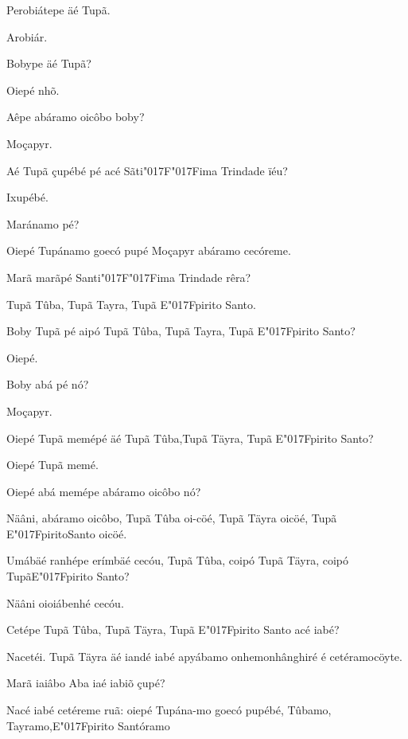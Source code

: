 \documentclass[openany,titlepage,12pt]{book}
\newcommand{\lgS}{\char"017F}
\newcommand{\lgSS}{\char"017F\char"017F}
\begin{document}
\begin{alternate}
    \item Perobiátepe äé Tupã.
    \item Arobiár.
    \item Bobype äé Tupã?
    \item Oiepé nhõ.
    \item Aêpe abáramo oicôbo boby? \newpage
    \item Moçapyr.
    \item Aé Tupã çupébé pé acé Sãti\lgSS ima Trindade ïéu?
    \item Ixupébé.
    \item Maránamo pé?
    \item Oiepé Tupánamo goecó pupé Moçapyr abáramo cecóreme.
    \item Marã marãpé Santi\lgSS ima Trindade rêra?
    \item Tupã Tûba, Tupã Tayra, Tupã E\lgS pirito Santo.
    \item Boby Tupã pé aipó Tupã Tûba, Tupã Tayra, Tupã
    E\lgS pirito Santo?
    \item Oiepé.
    \item Boby abá pé nó?
    \item Moçapyr.
    \item Oiepé Tupã memépé äé Tupã Tûba,\linebreak Tupã Täyra, 
    Tupã E\lgS pirito Santo?
    \item Oiepé Tupã memé.
    \item Oiepé abá memépe abáramo oicôbo nó?
    \item Näâni, abáramo oicôbo, Tupã Tûba oi-cöé,
    Tupã Täyra oicöé, Tupã E\lgS pirito\linebreak Santo oicöé.
    \item Umábäé ranhépe erímbäé cecóu, Tupã Tûba, coipó
    Tupã Täyra, coipó Tupã\linebreak E\lgS pirito Santo?
    \item Näâni oioiábenhé cecóu.
    \item Cetépe Tupã Tûba, Tupã Täyra, Tupã 
    \newpage E\lgS pirito Santo acé iabé?
    \item Nacetéi. Tupã Täyra äé iandé iabé apyábamo
    onhemonhânghiré é cetéramo\linebreak cöyte.
    \item Marã iaiâbo Aba iaé iabiõ çupé?
    \item Nacé iabé cetéreme ruã: oiepé Tupána-mo goecó
    pupébé, Tûbamo, Tayramo,\linebreak E\lgS pirito Santóramo

\end{alternate}
\end{document}
